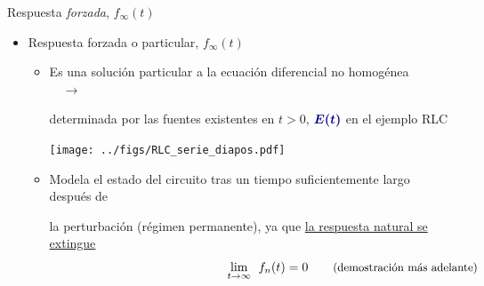 \documentclass[aspectratio=169, usenames,svgnames,dvipsnames]{beamer}
\begin{document}
\begin{frame}{Respuesta \textit{forzada}, \hspace{3mm}$f_\infty(t)$}

    \vspace{2mm}
    \begin{itemize}     
        \item Respuesta \alert{forzada} o particular, \hspace{3mm}\(f_\infty(t)\)

            \vspace{3mm}
            \begin{itemize}
                \normalsize

                \item Es una \alert{solución particular} a la ecuación diferencial \alert{no homogénea} $\quad\rightarrow\quad$
        
                \vspace{2mm}
                determinada por las fuentes existentes en \hspace{2mm}\(t > 0\), \hspace{3mm}${\boldsymbol{\color{blue!50!black} E(t)}}$ en el ejemplo RLC
                \begin{center}
                    \texttt{[image: ../figs/RLC\_serie\_diapos.pdf]}
                \end{center}   

                \vspace{3mm}
                \item Modela el estado del circuito \alert{tras un tiempo} suficientemente \alert{largo} después de 
                
                la perturbación (régimen permanente), ya que \underline{la respuesta natural se extingue} 
                \[
                    \hspace*{50mm} \lim_{t \to \infty} \;\, f_n(t) = 0
                    \qquad \textrm{\small(demostración más adelante)}
                \]
            \end{itemize}
    \end{itemize}
\end{frame}

\end{document}
